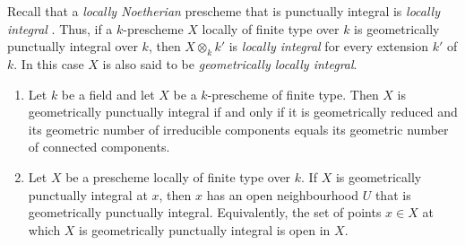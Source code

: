 Recall that a \emph{locally Noetherian} prescheme that is punctually integral
is \emph{locally integral} .
Thus, if a $k$-prescheme $X$ locally of finite type over $k$ is
geometrically punctually integral over $k$, then
$X\otimes_k k'$ is \emph{locally integral} for every extension $k'$ of $k$.
In this case $X$ is also said to be
\emph{geometrically locally integral}.

\begin{proposition}[4.6.15]
\label{IV.4.6.15}
\begin{enumerate}
\item[\rm(i)]
\label{IV.4.6.15.i}
Let $k$ be a field and let $X$ be a $k$-prescheme of finite type.
Then $X$ is geometrically punctually integral if and only if it is
geometrically reduced and its geometric number of irreducible
components equals its geometric number of connected components.

\item[\rm(ii)]
\label{IV.4.6.15.ii}
Let $X$ be a prescheme locally of finite type over $k$.
If $X$ is geometrically punctually integral at $x$, then $x$ has an
open neighbourhood $U$ that is geometrically punctually integral.
Equivalently, the set of points $x\in X$ at which $X$ is geometrically
punctually integral is open in $X$.
\end{enumerate}
\end{proposition}

